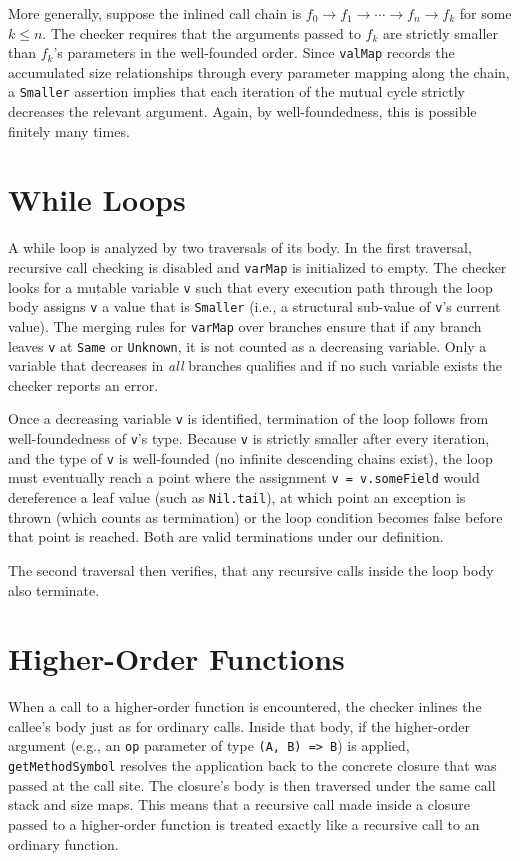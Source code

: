More generally, suppose the inlined call chain is
$f_0 \to f_1 \to \cdots \to f_n \to f_k$ for some $k \leq n$.
The checker requires that the arguments passed to $f_k$ are strictly smaller
than $f_k$'s parameters in the well-founded order. Since \texttt{valMap} records
the accumulated size relationships through every parameter mapping along the
chain, a \texttt{Smaller} assertion implies that each iteration of the mutual
cycle strictly decreases the relevant argument. Again, by well-foundedness, this
is possible finitely many times.


\section{While Loops}
A while loop is analyzed by two traversals of its body. In the first traversal,
recursive call checking is disabled and \texttt{varMap} is initialized to empty.
The checker looks for a mutable variable \texttt{v} such that every execution
path through the loop body assigns \texttt{v} a value that is \texttt{Smaller}
(i.e., a structural sub-value of \texttt{v}'s current value).
The merging rules for \texttt{varMap} over branches ensure that if any branch
leaves \texttt{v} at \texttt{Same} or \texttt{Unknown}, it is not counted as a
decreasing variable. Only a variable that decreases in \emph{all} branches
qualifies and if no such variable exists the checker reports an error.

Once a decreasing variable \texttt{v} is identified, termination of the loop
follows from well-foundedness of \texttt{v}'s type. Because \texttt{v} is
strictly smaller after every iteration, and the type of \texttt{v} is
well-founded (no infinite descending chains exist), the loop must eventually
reach a point where the assignment \texttt{v = v.someField} would dereference a
leaf value (such as \texttt{Nil.tail}), at which point an exception is thrown
(which counts as termination) or the loop condition becomes false before that
point is reached. Both are valid terminations under our definition.

The second traversal then verifies, that any recursive calls inside the loop
body also terminate.


\section{Higher-Order Functions}
When a call to a higher-order function is encountered, the checker inlines the
callee's body just as for ordinary calls. Inside that body, if the higher-order
argument (e.g., an \texttt{op} parameter of type \texttt{(A, B) => B}) is
applied, \texttt{getMethodSymbol} resolves the application back to the concrete
closure that was passed at the call site. The closure's body is then traversed
under the same call stack and size maps.
This means that a recursive call made inside a closure passed to a higher-order
function is treated exactly like a recursive call to an ordinary function.

